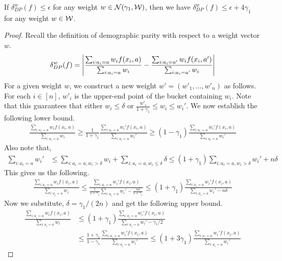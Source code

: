


\begin{lemma}
If $\delta^w_{DP}(f) \le \epsilon$ for any weight $w \in \mathcal{N}(\gamma_1,\mathcal{W})$, then we have $\delta^w_{DP}(f) \le \epsilon + 4\gamma_1$ for any weight $w \in \mathcal{W}$.
\end{lemma}
\begin{proof}
Recall the definition of demographic parity with respect to a weight vector $w$.
$$\delta^w_{DP}(f) = \left| \frac{\sum_{i: a_i = a} w_i f(x_i,a)}{\sum_{i: a_i = a} w_i} -  \frac{\sum_{i: a_i = a'} w_i f(x_i,a')}{{\sum_{i: a_i = a'} w_i}} \right|$$ 
For a given weight $w$, we construct a new weight $w' = (w'_1,\ldots,w'_n)$ as follows. For each $i \in [n]$, $w'_i$ is the upper-end point of the bucket containing $w_i$. Note that this guarantees that either $w_i\le \delta$ or $\frac{w'_i}{1+\gamma_1} \le w_i \le w_i'$. We now establish the following lower bound.
\begin{align}\label{eq:lbd-ratio}
\frac{\sum_{i: a_i = a} w_i f(x_i,a)}{\sum_{i: a_i = a} w_i} \ge \frac{1}{1+\gamma_1}  \frac{\sum_{i: a_i = a} w_i' f(x_i,a)}{\sum_{i: a_i = a} w_i'} \ge (1-\gamma_1) \frac{\sum_{i: a_i = a} w_i' f(x_i,a)}{\sum_{i: a_i = a} w_i'} 
\end{align}
Also note that,
\begin{align*}
\sum_{i: a_i = a} w_i' &\le \sum_{i:a_i = a, w_i > \delta} w_i + \sum_{i: a_i = a, w_i \le \delta} \delta 
\le (1+\gamma_1) \sum_{i:a_i = a, w_i > \delta} w_i' + n \delta
\end{align*}
This gives us the following.
\begin{align*}
\frac{\sum_{i: a_i = a} w_i f(x_i,a)}{\sum_{i: a_i = a} w_i} \le \frac{\sum_{i: a_i = a} w_i' f(x_i,a)}{\frac{1}{1+\gamma_1}\sum_{i: a_i = a} w_i' - \frac{n\delta}{1+\gamma_1} }  \le (1+\gamma_1) \frac{\sum_{i: a_i = a} w_i' f(x_i,a)}{\sum_{i: a_i = a} w_i' - n\delta } 
\end{align*}
Now we substitute, $\delta=\gamma_1/(2n)$ and get the following upper bound.
\begin{align}%
\frac{\sum_{i: a_i = a} w_i f(x_i,a)}{\sum_{i: a_i = a} w_i} &\le (1+\gamma_1) \frac{\sum_{i: a_i = a} w_i' f(x_i,a)}{\sum_{i: a_i = a} w_i' - \gamma_1/2}\nonumber \\ &\le \frac{1+\gamma_1}{1-\gamma_1} \frac{\sum_{i: a_i = a} w_i' f(x_i,a)}{\sum_{i: a_i = a} w_i'} \le (1+3\gamma_1)  \frac{\sum_{i: a_i = a} w_i' f(x_i,a)}{\sum_{i: a_i = a} w_i'}\label{eq:ubd-ratio}
\end{align}

\end{proof}

